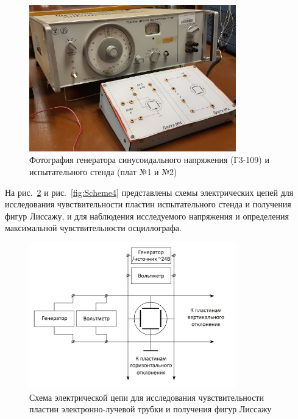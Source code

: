 \begin{figure}[H]
\centering
\includegraphics[width=0.8\textwidth]{Photo2.jpg}
\caption{Фотография генератора синусоидального напряжения (Г3-109) и испытательного стенда (плат №1 и №2)}
\label{fig:Photo2}
\end{figure}

На рис.~\ref{fig:Scheme3} и рис.~\ref{fig:Scheme4} представлены схемы электрических цепей для исследования чувствительности пластин испытательного стенда и получения фигур Лиссажу, и для наблюдения исследуемого напряжения и определения максимальной чувствительности осциллографа.

\begin{figure}[H]
\centering
\includegraphics[width=0.8\textwidth]{Scheme3.png}
\caption{Схема электрической цепи для исследования чувствительности пластин электронно-лучевой трубки и получения фигур Лиссажу}
\label{fig:Scheme3}
\end{figure}

